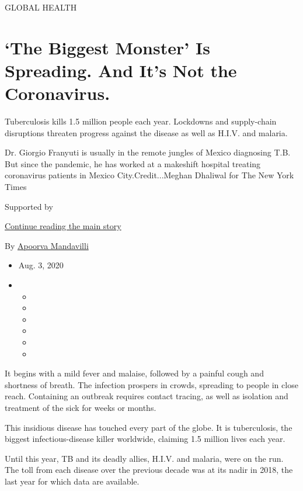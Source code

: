 GLOBAL HEALTH

\hypertarget{the-biggest-monster-is-spreading-and-its-not-the-coronavirus}{%
\section{`The Biggest Monster' Is Spreading. And It's Not the
Coronavirus.}\label{the-biggest-monster-is-spreading-and-its-not-the-coronavirus}}

Tuberculosis kills 1.5 million people each year. Lockdowns and
supply-chain disruptions threaten progress against the disease as well
as H.I.V. and malaria.

Dr. Giorgio Franyuti is usually in the remote jungles of Mexico
diagnosing T.B. But since the pandemic, he has worked at a makeshift
hospital treating coronavirus patients in Mexico City.Credit...Meghan
Dhaliwal for The New York Times

Supported by

\protect\hyperlink{after-sponsor}{Continue reading the main story}

By
\href{https://www.nytimes3xbfgragh.onion/by/apoorva-mandavilli}{Apoorva
Mandavilli}

\begin{itemize}
\item
  Aug. 3, 2020
\item
  \begin{itemize}
  \item
  \item
  \item
  \item
  \item
  \item
  \end{itemize}
\end{itemize}

It begins with a mild fever and malaise, followed by a painful cough and
shortness of breath. The infection prospers in crowds, spreading to
people in close reach. Containing an outbreak requires contact tracing,
as well as isolation and treatment of the sick for weeks or months.

This insidious disease has touched every part of the globe. It is
tuberculosis, the biggest infectious-disease killer worldwide, claiming
1.5 million lives each year.

Until this year, TB and its deadly allies, H.I.V. and malaria, were on
the run. The toll from each disease over the previous decade was at its
nadir in 2018, the last year for which data are available.

